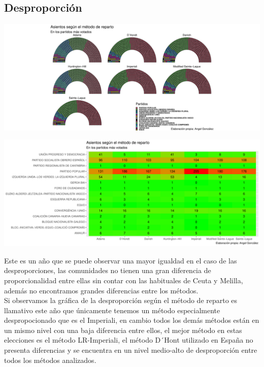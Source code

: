 \documentclass[12pt,a4paper,]{book}
\numberwithin{dummy}{section}
\theoremstyle{ocrenumbox}
\theoremstyle{blacknumex}
\theoremstyle{blacknumbox}
\theoremstyle{ocrenum}
\theoremstyle{ocrenum}
\begin{document}
\hypertarget{desproporciuxf3n-9}{%
\subsection{Desproporción}\label{desproporciuxf3n-9}}

\begin{center}\includegraphics[width=1\linewidth]{figurasR/unnamed-chunk-101-1} \end{center}

\begin{center}\includegraphics[width=1\linewidth]{figurasR/unnamed-chunk-101-2} \end{center}

Este es un año que se puede observar una mayor igualdad en el caso de
las desproporciones, las comunidades no tienen una gran diferencia de
proporcionalidad entre ellas sin contar con las habituales de Ceuta y
Melilla, además no encontramos grandes diferencias entre los métodos.\\
Si observamos la gráfica de la desproporción según el método de reparto
es llamativo este año que únicamente tenemos un método especialmente
despropocionado que es el Imperiali, en cambio todos los demás métodos
están en un mismo nivel con una baja diferencia entre ellos, el mejor
método en estas elecciones es el método LR-Imperiali, el método D´Hont
utilizado en España no presenta diferencias y se encuentra en un nivel
medio-alto de desproporción entre todos los métodos analizados.
\end{document}
